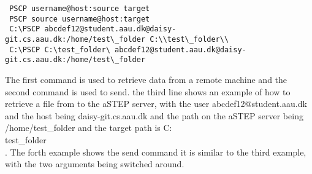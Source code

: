 \begin{lstlisting}
 PSCP username@host:source target
 PSCP source username@host:target
 C:\PSCP abcdef12@student.aau.dk@daisy-git.cs.aau.dk:/home/test\_folder C:\\test\_folder\\
 C:\PSCP C:\test_folder\ abcdef12@student.aau.dk@daisy-git.cs.aau.dk:/home/test\_folder
\end{lstlisting}

The first command is used to retrieve data from a remote machine and the second command is used to send. the third line shows an example of how to retrieve a file from to the aSTEP server, with the user abcdef12@student.aau.dk and the host being daisy-git.cs.aau.dk and the path on the aSTEP server being /home/test\_folder and the target path is C:\\test\_folder\\. The forth example shows the send command it is similar to the third example, with the two arguments being switched around. 



